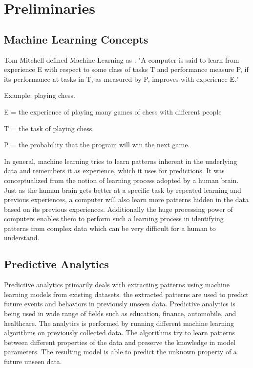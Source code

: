 \documentclass[11pt,openright]{report}
\begin{document}
\section{Preliminaries}\label{section:preliminaries}

\subsection{Machine Learning Concepts}

\noindent  Tom Mitchell defined Machine Learning as \cite{Mitchell1997}: 
\newline\newline
\hangindent=0.7cm "A computer is said to learn from experience E with respect to some class of tasks T and performance measure P, if its performance at tasks in T, as measured by P, improves with experience E." \newline 

\noindent Example: playing chess.

\noindent E = the experience of playing many games of chess with different people

\noindent T = the task of playing chess.

\noindent P = the probability that the program will win the next game.\newline 

\noindent In general, machine learning tries to learn patterns inherent in the underlying data and remembers it as experience, which it uses for predictions. It was conceptualized from the notion of learning process adopted by a human brain. Just as the human brain gets better at a specific task by repeated learning and previous experiences, a computer will also learn more patterns hidden in the data based on its previous experiences. Additionally the huge processing power of computers enables them to perform such a learning process in identifying patterns from complex data which can be very difficult for a human to understand. 

\subsection{Predictive Analytics}
Predictive analytics primarily deals with extracting patterns using machine learning models from existing datasets. the extracted patterns are used to predict future events and behaviors in previously unseen data. Predictive analytics is being used in wide range of fields such as education, finance, automobile, and healthcare. The analytics is performed by running different machine learning algorithms on previously collected data. The algorithms try to learn patterns between different properties of the data and preserve the knowledge in model parameters. The resulting model is able to predict the unknown property of a future unseen data. 
\end{document}
